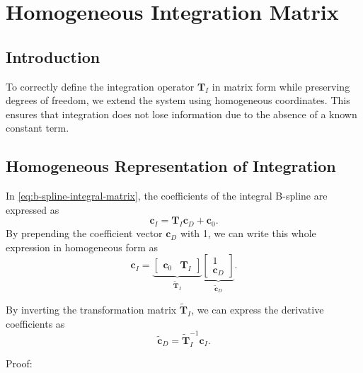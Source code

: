 

\chapter{\textbf{Homogeneous Integration Matrix}}

\section{\textbf{Introduction}}

To correctly define the integration operator $\mathbf{T}_I$ in matrix form while preserving degrees of freedom, we extend the system using homogeneous coordinates. This ensures that integration does not lose information due to the absence of a known constant term.

\section{\textbf{Homogeneous Representation of Integration}}

In \cref{eq:b-spline-integral-matrix}, the coefficients of the integral B-spline are expressed as
\begin{equation}
    \mathbf{c}_I = \mathbf T_I \mathbf{c}_D + \mathbf{c}_0.
\end{equation}
By prepending the coefficient vector $\mathbf{c}_D$ with 1, we can write this whole expression in homogeneous form as
\begin{equation}
    \mathbf{c}_I = 
    \underbrace{
        \begin{bmatrix}
            \mathbf{c}_0 & \mathbf T_I
        \end{bmatrix} 
    } _{\mathbf{\tilde T}_I}
    \underbrace{
        \begin{bmatrix}
            1 \\
            \mathbf{c}_D
        \end{bmatrix}
    }_{\mathbf{\tilde c}_D}.
\end{equation}

By inverting the transformation matrix $\mathbf{\tilde T}_I$, we can express the derivative coefficients as
\begin{equation}
    \mathbf{\tilde c}_D = \mathbf{\tilde T}_I^{-1} \mathbf{c}_I.
\end{equation}

Proof:
